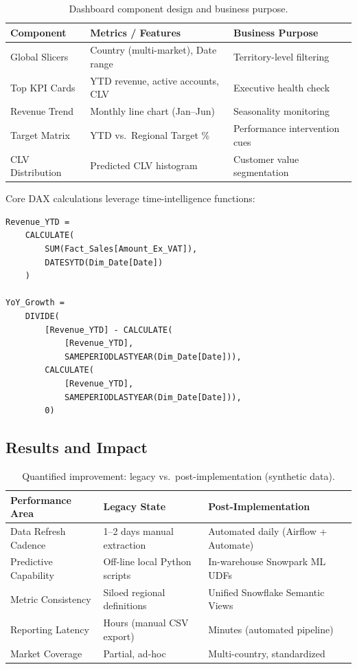 \documentclass[11pt,a4paper]{article}
\begin{document}
\begin{table}[H]
\caption{Dashboard component design and business purpose.}
\setlength{\tabcolsep}{8pt}
\renewcommand{\arraystretch}{1.4}
\begin{tabular}{l l l}
\toprule
\textbf{Component} & \textbf{Metrics / Features} & \textbf{Business Purpose} \\
\midrule
Global Slicers & Country (multi-market), Date range & Territory-level filtering \\
Top KPI Cards & YTD revenue, active accounts, CLV & Executive health check \\
Revenue Trend & Monthly line chart (Jan--Jun) & Seasonality monitoring \\
Target Matrix & YTD vs.\ Regional Target \% & Performance intervention cues \\
CLV Distribution & Predicted CLV histogram & Customer value segmentation \\
\bottomrule
\end{tabular}
\end{table}

Core DAX calculations leverage time-intelligence functions:

\begin{lstlisting}[language={},caption={DAX measures for YTD revenue and Year-over-Year growth.}]
Revenue_YTD =
    CALCULATE(
        SUM(Fact_Sales[Amount_Ex_VAT]),
        DATESYTD(Dim_Date[Date])
    )

YoY_Growth =
    DIVIDE(
        [Revenue_YTD] - CALCULATE(
            [Revenue_YTD],
            SAMEPERIODLASTYEAR(Dim_Date[Date])),
        CALCULATE(
            [Revenue_YTD],
            SAMEPERIODLASTYEAR(Dim_Date[Date])),
        0)
\end{lstlisting}

\subsection{Results and Impact}

\begin{table}[H]
\caption{Quantified improvement: legacy vs.\ post-implementation (synthetic data).}
\setlength{\tabcolsep}{5pt}
\renewcommand{\arraystretch}{1.4}
\begin{tabular}{l l l}
\toprule
\textbf{Performance Area} & \textbf{Legacy State} & \textbf{Post-Implementation} \\
\midrule
Data Refresh Cadence & 1--2 days manual extraction & Automated daily (Airflow + Automate) \\
Predictive Capability & Off-line local Python scripts & In-warehouse Snowpark ML UDFs \\
Metric Consistency & Siloed regional definitions & Unified Snowflake Semantic Views \\
Reporting Latency & Hours (manual CSV export) & Minutes (automated pipeline) \\
Market Coverage & Partial, ad-hoc & Multi-country, standardized \\
\bottomrule
\end{tabular}
\end{table}
\end{document}

